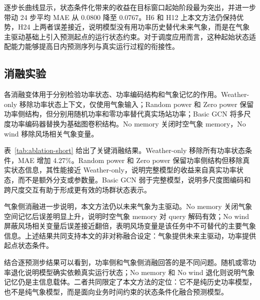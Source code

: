 
逐步长曲线显示，状态条件化带来的收益在目标窗口起始阶段最为突出，并进一步带动 24 步平均 MAE 从 0.0800 降至 0.0767。H6 和 H12 上本文方法仍保持优势，H24 上两者误差接近，说明模型没有用功率历史替代未来气象，而是在气象主驱动基础上引入预测起点的运行状态约束。对于调度应用而言，这种起始状态适配能力能够提高日内预测序列与真实运行过程的衔接性。

\subsection{消融实验}

各消融变体用于分别检验功率状态、功率编码结构和气象记忆的作用。Weather-only 移除功率状态上下文，仅使用气象输入；Random power 和 Zero power 保留功率侧结构，但分别用随机功率和零功率替代真实场站功率；Basic GCN 将多尺度功率编码器替换为基础图卷积结构。No memory 关闭时空气象 memory，No wind 移除风场相关气象变量。

表~\ref{tab:ablation-short} 给出了关键消融结果。Weather-only 移除所有功率状态条件，MAE 增加 4.27\%。Random power 和 Zero power 保留功率侧结构但移除真实状态信息，其性能接近 Weather-only，说明完整模型的收益来自真实功率状态，而不是额外分支或参数量。Basic GCN 弱于完整模型，说明多尺度图编码和跨尺度交互有助于形成更有效的场群状态表示。


气象侧消融进一步说明，本文方法仍以未来气象为主驱动。No memory 关闭气象空间记忆后误差明显上升，说明时空气象 memory 对 query 解码有效；No wind 屏蔽风场相关变量后误差接近翻倍，表明风场变量是该任务中不可替代的主要气象信息。上述结果共同支持本文的非对称融合设定：气象提供未来主驱动，功率提供起点状态条件。

结合逐预测步结果可以看到，功率侧和气象侧消融回答的是不同问题。随机或零功率退化说明模型确实依赖真实运行状态；No memory 和 No wind 退化则说明气象记忆仍是主信息载体。二者共同限定了本文方法的定位：它不是纯历史功率模型，也不是纯气象模型，而是面向业务时间约束的状态条件化融合预测模型。
